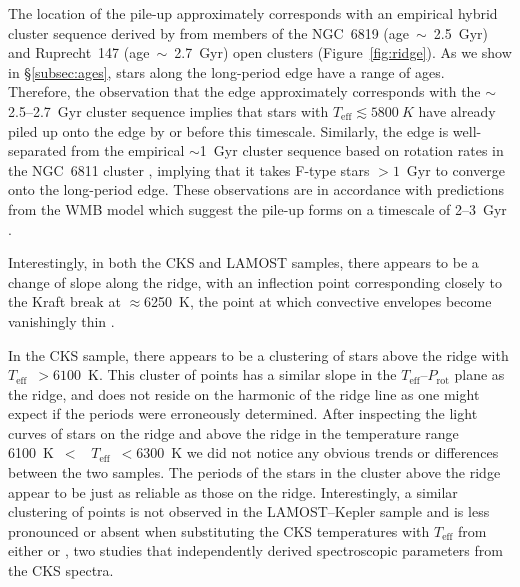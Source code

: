 \documentclass[twocolumn]{aastex631}
\newcommand{\teff}{\ensuremath{T_{\mathrm{eff}}}\xspace}
\newcommand{\prot}{\ensuremath{P_\mathrm{rot}}\xspace}
\begin{document}
The location of the pile-up approximately corresponds with an empirical hybrid cluster sequence derived by \citet{Curtis2020} from members of the NGC~6819 (age~$\sim$~2.5~Gyr) and Ruprecht~147 (age~$\sim$~2.7~Gyr) open clusters (Figure~\ref{fig:ridge}). As we show in \S\ref{subsec:ages}, stars along the long-period edge have a range of ages. Therefore, the observation that the edge approximately corresponds with the $\sim$2.5--2.7~Gyr cluster sequence implies that stars with \teff$\lesssim 5800~K$ have already piled up onto the edge by or before this timescale. Similarly, the edge is well-separated from the empirical $\sim$1~Gyr cluster sequence based on rotation rates in the NGC~6811 cluster \citep{Curtis2020}, implying that it takes F-type stars $>1$~Gyr to converge onto the long-period edge. These observations are in accordance with predictions from the WMB model which suggest the pile-up forms on a timescale of 2--3~Gyr \citep{vanSaders2019}.

Interestingly, in both the CKS and LAMOST samples, there appears to be a change of slope along the ridge, with an inflection point corresponding closely to the Kraft break at $\approx$6250~K, the point at which convective envelopes become vanishingly thin \citep{Kraft1967}. %

In the CKS sample, there appears to be a clustering of stars above the ridge with \teff~$>6100$~K. This cluster of points has a similar slope in the \teff--\prot plane as the ridge, and does not reside on the harmonic of the ridge line as one might expect if the periods were erroneously determined. After inspecting the light curves of stars on the ridge and above the ridge in the temperature range 6100~K~$<$~ \teff~$<6300$~K we did not notice any obvious trends or differences between the two samples. The periods of the stars in the cluster above the ridge appear to be just as reliable as those on the ridge. Interestingly, a similar clustering of points is not observed in the LAMOST--Kepler sample and is less pronounced or absent when substituting the CKS temperatures with \teff from either \citet{Brewer2018} or \citet{Martinez2019}, two studies that independently derived spectroscopic parameters from the CKS spectra. 
\end{document}
